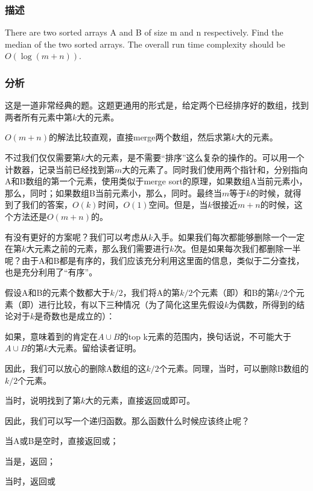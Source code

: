 \subsubsection{描述}
There are two sorted arrays A and B of size m and n respectively. Find the median of the two sorted arrays. The overall run time complexity should be $O(\log (m+n))$.


\subsubsection{分析}
这是一道非常经典的题。这题更通用的形式是，给定两个已经排序好的数组，找到两者所有元素中第$k$大的元素。

$O(m+n)$的解法比较直观，直接merge两个数组，然后求第$k$大的元素。

不过我们仅仅需要第$k$大的元素，是不需要“排序”这么复杂的操作的。可以用一个计数器，记录当前已经找到第$m$大的元素了。同时我们使用两个指针和，分别指向A和B数组的第一个元素，使用类似于merge sort的原理，如果数组A当前元素小，那么，同时；如果数组B当前元素小，那么，同时。最终当$m$等于$k$的时候，就得到了我们的答案，$O(k)$时间，$O(1)$空间。但是，当$k$很接近$m+n$的时候，这个方法还是$O(m+n)$的。

有没有更好的方案呢？我们可以考虑从$k$入手。如果我们每次都能够删除一个一定在第$k$大元素之前的元素，那么我们需要进行$k$次。但是如果每次我们都删除一半呢？由于A和B都是有序的，我们应该充分利用这里面的信息，类似于二分查找，也是充分利用了“有序”。

假设A和B的元素个数都大于$k/2$，我们将A的第$k/2$个元素（即）和B的第$k/2$个元素（即）进行比较，有以下三种情况（为了简化这里先假设$k$为偶数，所得到的结论对于$k$是奇数也是成立的）：
\begindot
\item {}
\item {}
\item {}
\myenddot

如果，意味着到\fn{A[k/2-1}的肯定在$A \cup B$的top k元素的范围内，换句话说，\fn{A[k/2-1}不可能大于$A \cup B$的第$k$大元素。留给读者证明。

因此，我们可以放心的删除A数组的这$k/2$个元素。同理，当时，可以删除B数组的$k/2$个元素。

当时，说明找到了第$k$大的元素，直接返回或即可。

因此，我们可以写一个递归函数。那么函数什么时候应该终止呢？
\begindot
\item 当A或B是空时，直接返回或；
\item 当是，返回；
\item 当时，返回或
\myenddot


